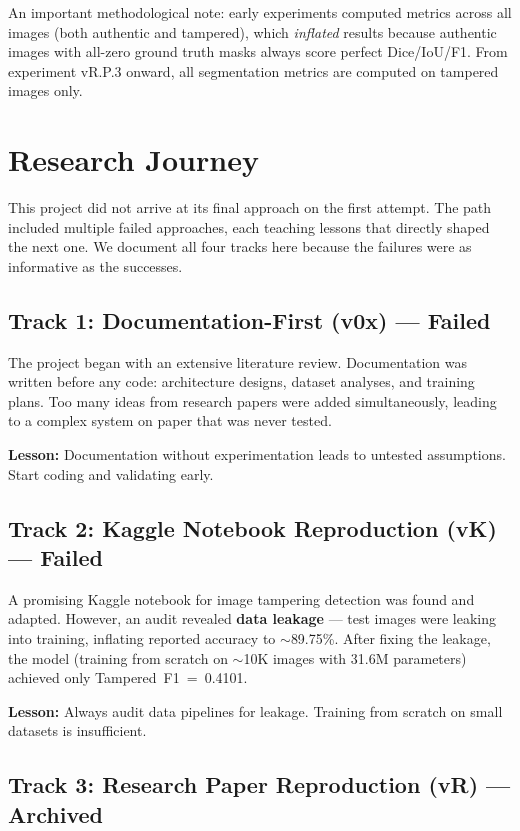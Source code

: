 \documentclass[conference]{IEEEtran}
\begin{document}
An important methodological note: early experiments computed metrics across all images (both authentic and tampered), which \textit{inflated} results because authentic images with all-zero ground truth masks always score perfect Dice/IoU/F1. From experiment vR.P.3 onward, all segmentation metrics are computed on tampered images only.


\section{Research Journey}

This project did not arrive at its final approach on the first attempt. The path included multiple failed approaches, each teaching lessons that directly shaped the next one. We document all four tracks here because the failures were as informative as the successes.

\subsection{Track 1: Documentation-First (v0x) --- Failed}

The project began with an extensive literature review. Documentation was written before any code: architecture designs, dataset analyses, and training plans. Too many ideas from research papers were added simultaneously, leading to a complex system on paper that was never tested.

\textbf{Lesson:} Documentation without experimentation leads to untested assumptions. Start coding and validating early.

\subsection{Track 2: Kaggle Notebook Reproduction (vK) --- Failed}

A promising Kaggle notebook for image tampering detection was found and adapted. However, an audit revealed \textbf{data leakage} --- test images were leaking into training, inflating reported accuracy to $\sim$89.75\%. After fixing the leakage, the model (training from scratch on $\sim$10K images with 31.6M parameters) achieved only Tampered~F1~=~0.4101.

\textbf{Lesson:} Always audit data pipelines for leakage. Training from scratch on small datasets is insufficient.

\subsection{Track 3: Research Paper Reproduction (vR) --- Archived}
\end{document}

